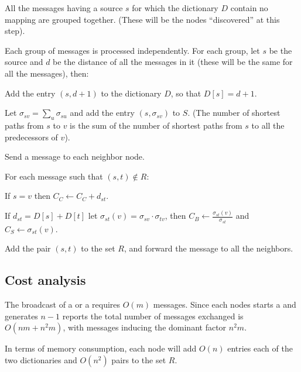 \begin{algosteps}

  \item All the \mdisc{} messages having a source $s$ for which the dictionary $D$ contain no mapping are grouped together. (These will be the nodes ``discovered'' at this step).

  \item Each group of messages is processed independently. For each group, let $s$ be the source and $d$ be the distance of all the  messages in it (these will be the same for all the messages), then:
  \begin{algosteps}
    \item Add the entry $(s,d+1)$ to the dictionary $D$, so that $D[s] = d+1$.
    \item Let $\sigma_{sv} = \sum_{u} \sigma_{su}$ and add the entry $(s,\sigma_{sv})$ to  $S$. (The number of shortest paths from $s$ to $v$ is the sum of the number of shortest paths from $s$ to all the predecessors of $v$).
    \item Send a  message to each neighbor node.
  \end{algosteps}
  
  \item For each  message such that $(s,t) \notin R$:
  \begin{algosteps}
    \item If $s = v$ then $C_C \gets C_C + d_{st}$.
    \item If $d_{st} = D[s]+D[t]$ let $\sigma_{st}(v) = \sigma_{sv} \cdot \sigma_{tv}$, then $C_B \gets \frac{\sigma_{st}(v)}{\sigma_{st}}$ and $C_S \gets \sigma_{st}(v)$.
    \item Add the pair $(s,t)$ to the set $R$, and forward the \mrep{} message to all the neighbors.
  \end{algosteps}
\end{algosteps}

\subsection{Cost analysis}
The broadcast of a \mdisc{} or a \mrep{} requires $O(m)$ messages. Since each nodes starts a \mdisc{} and generates $n-1$ reports the total number of messages exchanged is $O(nm + n^2m)$, with \mrep{} messages inducing the dominant factor $n^2m$.

In terms of memory consumption, each node will add $O(n)$ entries each of the two dictionaries and $O(n^2)$ pairs to the set $R$.
